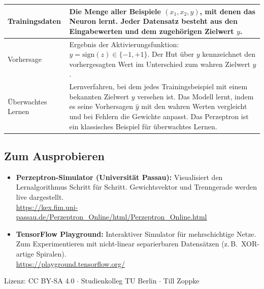 \documentclass[ngerman,11pt]{article}
\begin{document}
\begin{center}
\begin{tabular}{|>{\raggedright\arraybackslash}p{4.2cm}|>{\raggedright\arraybackslash}p{10.8cm}|}
\hline
Trainingsdaten & Die Menge aller Beispiele $(x_1, x_2, y)$, mit denen das Neuron lernt. Jeder Datensatz besteht aus den Eingabewerten und dem zugehörigen Zielwert $y$. \\
\hline
Vorhersage & Ergebnis der Aktivierungsfunktion: $\hat{y} = \text{sign}(z) \in \{-1, +1\}$. Der Hut über $y$ kennzeichnet den vorhergesagten Wert im Unterschied zum wahren Zielwert $y$. \\
\hline
Überwachtes Lernen & Lernverfahren, bei dem jedes Trainingsbeispiel mit einem bekannten Zielwert $y$ versehen ist. Das Modell lernt, indem es seine Vorhersagen $\hat{y}$ mit den wahren Werten vergleicht und bei Fehlern die Gewichte anpasst. Das Perzeptron ist ein klassisches Beispiel für überwachtes Lernen. \\
\hline
\end{tabular}
\end{center}

\bigskip
\subsection*{Zum Ausprobieren}

\begin{itemize}[leftmargin=*]
\item \textbf{Perzeptron-Simulator (Universität Passau):} Visualisiert den Lernalgorithmus Schritt für Schritt. Gewichtsvektor und Trenngerade werden live dargestellt.\\
\url{https://kex.fim.uni-passau.de/Perzeptron_Online/html/Perzeptron_Online.html}

\item \textbf{TensorFlow Playground:} Interaktiver Simulator für mehrschichtige Netze. Zum Experimentieren mit nicht-linear separierbaren Datensätzen (z.\,B.\ XOR-artige Spiralen).\\
\url{https://playground.tensorflow.org/}
\end{itemize}

\bigskip
\noindent\footnotesize Lizenz: CC BY-SA 4.0 $\cdot$ Studienkolleg TU Berlin $\cdot$ Till Zoppke
\end{document}
